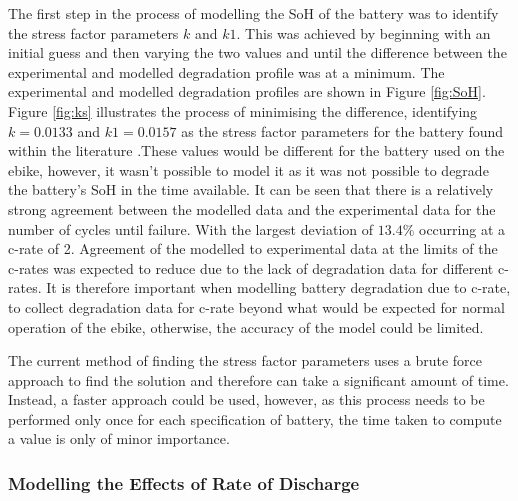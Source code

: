 \documentclass[a4paper, 10pt]{article}
\numberwithin{equation}{section}
\begin{document}
The first step in the process of modelling the SoH of the battery was to identify the stress factor parameters $k$ and $k1$. This was achieved by beginning with an initial guess and then varying the  two values and until the  difference between the experimental and modelled degradation profile was at a minimum. The experimental and modelled degradation profiles are shown in Figure \ref{fig:SoH}. Figure \ref{fig:ks} illustrates the process of minimising the difference, identifying $k=0.0133$ and $k1=0.0157$ as the stress factor parameters for the battery found within the literature \cite{report:cho}.These values would be different for the battery used on the ebike, however, it wasn't possible to model it as it was not possible to degrade the battery's SoH in the time available. It can be seen that there is a relatively strong agreement between the modelled data and the experimental data for the number of cycles until failure. With the largest deviation of $13.4\%$ occurring at a c-rate of 2. Agreement of the modelled to experimental data at the limits of the c-rates was expected to reduce due to the lack of degradation data for different c-rates. It is therefore important when modelling battery degradation due to c-rate, to collect degradation data for c-rate beyond what would be expected for normal operation of the ebike, otherwise, the accuracy of the model could be limited. 

The current method of finding the stress factor parameters uses a brute force approach to find the solution and therefore can take a significant amount of time. Instead, a faster approach could be used, however, as this process needs to be performed only once for each specification of battery, the time taken to compute a value is only of minor importance. 

\subsubsection{Modelling the Effects of Rate of Discharge}
\end{document}
